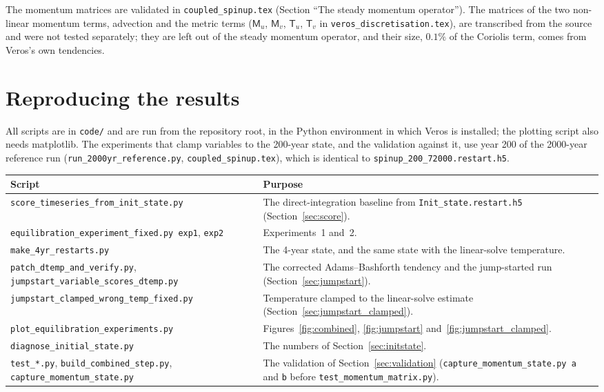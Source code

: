 \documentclass{article}
\begin{document}
The momentum matrices are validated in \texttt{coupled\_spinup.tex} (Section ``The steady momentum operator''). The matrices of the two non-linear momentum terms, advection and the metric terms ($\mathsf{M}_u$, $\mathsf{M}_v$, $\mathsf{T}_u$, $\mathsf{T}_v$ in \texttt{veros\_discretisation.tex}), are transcribed from the source and were not tested separately; they are left out of the steady momentum operator, and their size, $0.1\%$ of the Coriolis term, comes from Veros's own tendencies.

\section{Reproducing the results}\label{sec:repro}

All scripts are in \texttt{code/} and are run from the repository root, in the Python environment in which Veros is installed; the plotting script also needs matplotlib. The experiments that clamp variables to the 200-year state, and the validation against it, use year 200 of the 2000-year reference run (\texttt{run\_2000yr\_reference.py}, \texttt{coupled\_spinup.tex}), which is identical to \texttt{spinup\_200\_72000.restart.h5}.

\begin{table}[h]
\centering
\small
\renewcommand{\arraystretch}{1.2}
\begin{tabular}{>{\raggedright\arraybackslash}p{}|>{\raggedright\arraybackslash}p{}}
\toprule
Script & Purpose \\
\midrule
\texttt{score\_timeseries\_from\_init\_state.py} & The direct-integration baseline from \texttt{Init\_state.restart.h5} (Section~\ref{sec:score}). \\
\texttt{equilibration\_experiment\_fixed.py exp1}, \texttt{exp2} & Experiments~1 and~2. \\
\texttt{make\_4yr\_restarts.py} & The 4-year state, and the same state with the linear-solve temperature. \\
\texttt{patch\_dtemp\_and\_verify.py}, \texttt{jumpstart\_variable\_scores\_dtemp.py} & The corrected Adams--Bashforth tendency and the jump-started run (Section~\ref{sec:jumpstart}). \\
\texttt{jumpstart\_clamped\_wrong\_temp\_fixed.py} & Temperature clamped to the linear-solve estimate (Section~\ref{sec:jumpstart_clamped}). \\
\texttt{plot\_equilibration\_experiments.py} & Figures~\ref{fig:combined}, \ref{fig:jumpstart} and~\ref{fig:jumpstart_clamped}. \\
\texttt{diagnose\_initial\_state.py} & The numbers of Section~\ref{sec:initstate}. \\
\texttt{test\_*.py}, \texttt{build\_combined\_step.py}, \texttt{capture\_momentum\_state.py} & The validation of Section~\ref{sec:validation} (\texttt{capture\_momentum\_state.py a} and \texttt{b} before \texttt{test\_momentum\_matrix.py}). \\
\bottomrule
\end{tabular}
\end{table}
\end{document}
